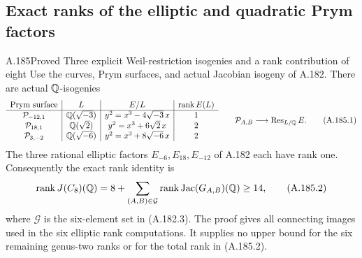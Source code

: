 \subsection{Exact ranks of the elliptic and quadratic Prym factors}

\begin{statement}{A.185}{Proved}
{Three explicit Weil-restriction isogenies and a rank contribution of eight}
Use the curves, Prym surfaces, and actual Jacobian isogeny of A.182.
There are actual \(\mathbb Q\)-isogenies
\[
\begin{array}{c|c|c|c}
\text{Prym surface}&L& E/L&\operatorname{rank}E(L)\\ \hline
\mathcal P_{-12,1}&\mathbb Q(\sqrt{-3})&y^2=x^3-4\sqrt{-3}\,x&1\\
\mathcal P_{18,1}&\mathbb Q(\sqrt2)&y^2=x^3+6\sqrt2\,x&2\\
\mathcal P_{3,-2}&\mathbb Q(\sqrt{-6})&y^2=x^3+8\sqrt{-6}\,x&2
\end{array}
\qquad
\mathcal P_{A,B}\longrightarrow\operatorname{Res}_{L/\mathbb Q}E.
\tag{A.185.1}
\]
The three rational elliptic factors \(E_{-6},E_{18},E_{-12}\) of
A.182 each have rank one.  Consequently the exact rank identity is
\[
 \operatorname{rank}J(C_8)(\mathbb Q)
 =8+\sum_{(A,B)\in\mathcal G}
          \operatorname{rank}\operatorname{Jac}(G_{A,B})(\mathbb Q)
 \geq14,
\tag{A.185.2}
\]
where \(\mathcal G\) is the six-element set in (A.182.3).
The proof gives all connecting images used in the six elliptic rank
computations.  It supplies no upper bound for the six remaining
genus-two ranks or for the total rank in (A.185.2).
\end{statement}

